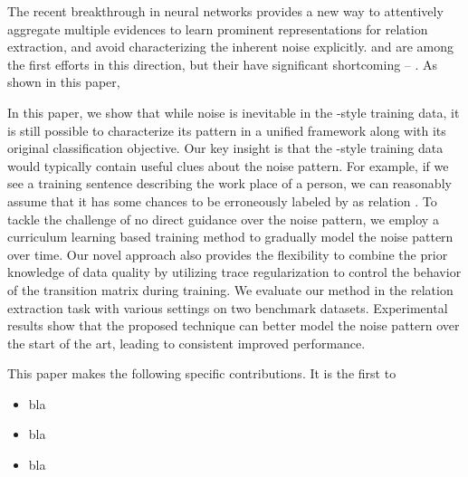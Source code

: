 The recent breakthrough in neural networks provides a new way to 
attentively aggregate multiple evidences to learn prominent representations for relation extraction, and avoid characterizing the inherent noise explicitly. \cite{zeng2015distant} and \cite{lin2016neural} are among the first efforts in this direction, but their have  significant shortcoming -- .
As shown in this paper, 

In this paper, we show that while noise is inevitable in the \DS-style training data, it is still possible to characterize its pattern  in a unified framework along with its original classification objective. Our key insight is that the \DS-style training  data would typically contain useful clues about the noise pattern. For example, if we see a training sentence describing the work place of a person, we can reasonably assume that it has some chances to be erroneously labeled by \DS as relation  .
  To tackle the challenge of no direct guidance over the noise pattern, we employ a curriculum learning based training method to gradually model the noise pattern over time. Our novel approach also provides the flexibility to combine the prior knowledge of data quality by utilizing trace regularization to control the behavior of the transition matrix during training.
We evaluate our method in the relation extraction task with various settings on two benchmark datasets. Experimental results show
that  the proposed technique can better model the noise pattern over the start of the art, leading to consistent improved performance.


This paper makes the following specific contributions. It is the first to
\begin{itemize}
\item bla
\item bla
\item bla
\end{itemize}

